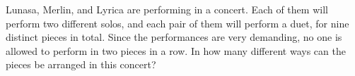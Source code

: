Lunasa, Merlin, and Lyrica are performing in a concert. Each of them will perform two different solos, and each pair of them will perform a duet, for nine distinct pieces in total. Since the performances are very demanding, no one is allowed to perform in two pieces in a row. In how many different ways can the pieces be arranged in this concert?
